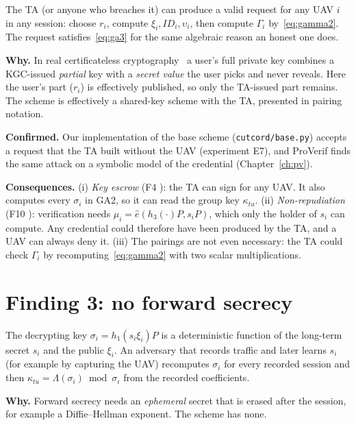 \begin{flawbox}[title={Key escrow and no non-repudiation (Table II claims F4 and F10 do not hold)}]
\begin{finding}\label{f:escrow}
The TA (or anyone who breaches it) can produce a valid request for any UAV $i$ in any session: choose $r_i$, compute
$\xi_i,ID_i,\upsilon_i$, then compute $\Gamma_i$ by~\eqref{eq:gamma2}. The request satisfies~\eqref{eq:ga3} for the same algebraic reason an honest one does.
\end{finding}
\textbf{Why.} In real certificateless cryptography~\cite{alriyami} a user's full private key combines a KGC-issued \emph{partial} key with a
\emph{secret value} the user picks and never reveals. Here the user's part ($r_i$) is effectively published, so only the TA-issued part remains.
The scheme is effectively a shared-key scheme with the TA, presented in pairing notation.

\textbf{Confirmed.} Our implementation of the base scheme (\texttt{cutcord/base.py}) accepts a request that the TA built without the UAV
(experiment E7), and ProVerif finds the same attack on a symbolic model of the credential (Chapter~\ref{ch:pv}).

\textbf{Consequences.}
(i) \emph{Key escrow} (F4 \no): the TA can sign for any UAV. It also computes every $\sigma_i$ in GA2, so it can read the group key $\kappa_{tu}$.
(ii) \emph{Non-repudiation} (F10 \no): verification needs $\mu_i=\hat e(h_3(\cdot)P,s_iP)$, which only the holder of $s_i$ can compute. Any
credential could therefore have been produced by the TA, and a UAV can always deny it.
(iii) The pairings are not even necessary: the TA could check $\Gamma_i$ by recomputing~\eqref{eq:gamma2} with two scalar multiplications.
\end{flawbox}

\section{Finding 3: no forward secrecy}
\begin{flawbox}[title={One leaked $s_i$ exposes every past group key (Table II claim F7 does not hold)}]
\begin{finding}\label{f:fs}
The decrypting key $\sigma_i=h_1(s_i\xi_i)P$ is a deterministic function of the long-term secret $s_i$ and the public $\xi_i$. An adversary that
records traffic and later learns $s_i$ (for example by capturing the UAV) recomputes $\sigma_i$ for every recorded session and then
$\kappa_{tu}=\Lambda(\sigma_i)\bmod\sigma_i$ from the recorded coefficients.
\end{finding}
\textbf{Why.} Forward secrecy needs an \emph{ephemeral} secret that is erased after the session, for example a Diffie--Hellman exponent. The scheme has none.
\end{flawbox}

